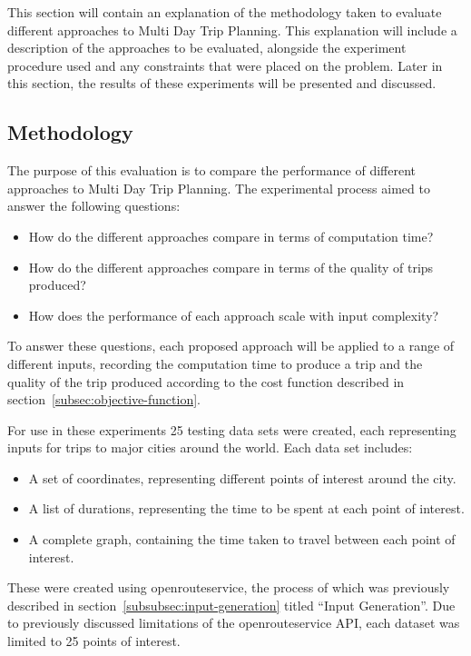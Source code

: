 This section will contain an explanation of the methodology taken to evaluate different approaches to Multi Day Trip
Planning.
This explanation will include a description of the approaches to be evaluated, alongside the experiment procedure used
and any constraints that were placed on the problem.
Later in this section, the results of these experiments will be presented and discussed.

\subsection{Methodology}\label{subsec:evaluation-methodology}
The purpose of this evaluation is to compare the performance of different approaches to Multi Day Trip Planning.
The experimental process aimed to answer the following questions:
\begin{itemize}
    \item How do the different approaches compare in terms of computation time?
    \item How do the different approaches compare in terms of the quality of trips produced?
    \item How does the performance of each approach scale with input complexity?
\end{itemize}
To answer these questions, each proposed approach will be applied to a range of different inputs, recording the
computation time to produce a trip and the quality of the trip produced according to the cost function described in
section~\ref{subsec:objective-function}.

\noindent
For use in these experiments 25 testing data sets were created, each representing inputs for trips to major cities
around the world.
Each data set includes:
\begin{itemize}
    \item A set of coordinates, representing different points of interest around the city.
    \item A list of durations, representing the time to be spent at each point of interest.
    \item A complete graph, containing the time taken to travel between each point of interest.
\end{itemize}
These were created using openrouteservice, the process of which was previously described in
section~\ref{subsubsec:input-generation} titled ``Input Generation''.
Due to previously discussed limitations of the openrouteservice API, each dataset was limited to 25 points of
interest.\\

